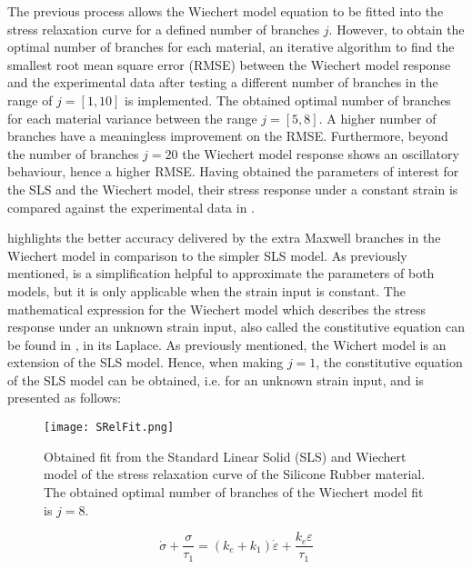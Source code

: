 The previous process allows the Wiechert model equation to be fitted into the stress relaxation curve for a defined number of branches $j$. However, to obtain the optimal number of branches for each material, an iterative algorithm to find the smallest root mean square error (RMSE) between the Wiechert model response and the experimental data after testing a different number of branches in the range of $j=[1,10]$ is implemented. The obtained optimal number of branches for each material variance between the range $j=[5,8]$. A higher number of branches have a meaningless improvement on the RMSE. Furthermore, beyond the number of branches $j=20$ the Wiechert model response shows an oscillatory behaviour, hence a higher RMSE. Having obtained the parameters of interest for the SLS and the Wiechert model, their stress response under a constant strain is compared against the experimental data in .

 highlights the better accuracy delivered by the extra Maxwell branches in the Wiechert model in comparison to the simpler SLS model. As previously mentioned,  is a simplification helpful to approximate the parameters of both models, but it is only applicable when the strain input is constant. The mathematical expression for the Wiechert model which describes the stress response under an unknown strain input, also called the constitutive equation can be found in \cite{roylance2001engineering}, in its Laplace. 
As previously mentioned, the Wichert model is an extension of the SLS model. Hence, when making $j=1$, the constitutive equation of the SLS model can be obtained, i.e. for an unknown strain input, and is presented as follows:

\begin{figure}[htb!]
	\centering
    \texttt{[image: SRelFit.png]}
    \caption{Obtained fit from the Standard Linear Solid (SLS) and Wiechert model of the stress relaxation curve of the Silicone Rubber material. The obtained optimal number of branches of the Wiechert model fit is $j=8$.}
    \label{fig:StressRelFit}
\end{figure}

\begin{equation}
\label{eq3}
\dot{\sigma} + \frac{\sigma}{\tau_1} =  (k_e + k_1)\dot{\varepsilon} + \frac{k_e\varepsilon}{\tau_1}
\end{equation}


